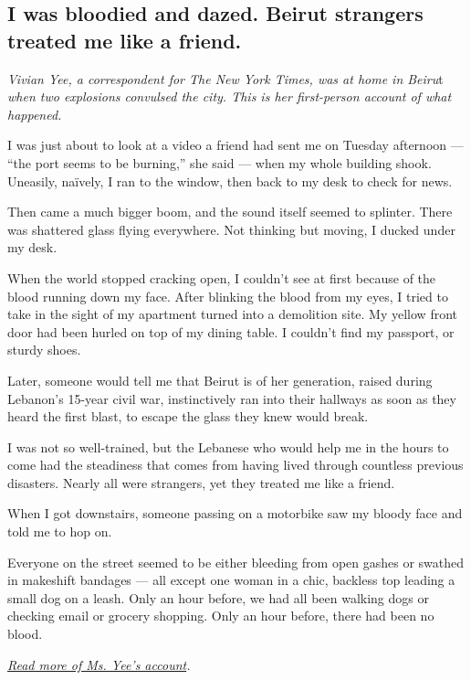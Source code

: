 \hypertarget{i-was-bloodied-and-dazed-beirut-strangers-treated-me-like-a-friend}{%
\subsection{I was bloodied and dazed. Beirut strangers treated me like a
friend.}\label{i-was-bloodied-and-dazed-beirut-strangers-treated-me-like-a-friend}}

\emph{Vivian Yee, a correspondent for The New York Times, was at home in
Beiru}t \emph{when two explosions convulsed the city. This is her
first-person account of what happened.}

I was just about to look at a video a friend had sent me on Tuesday
afternoon --- ``the port seems to be burning,'' she said --- when my
whole building shook. Uneasily, naïvely, I ran to the window, then back
to my desk to check for news.

Then came a much bigger boom, and the sound itself seemed to splinter.
There was shattered glass flying everywhere. Not thinking but moving, I
ducked under my desk.

When the world stopped cracking open, I couldn't see at first because of
the blood running down my face. After blinking the blood from my eyes, I
tried to take in the sight of my apartment turned into a demolition
site. My yellow front door had been hurled on top of my dining table. I
couldn't find my passport, or sturdy shoes.

Later, someone would tell me that Beirut is of her generation, raised
during Lebanon's 15-year civil war, instinctively ran into their
hallways as soon as they heard the first blast, to escape the glass they
knew would break.

I was not so well-trained, but the Lebanese who would help me in the
hours to come had the steadiness that comes from having lived through
countless previous disasters. Nearly all were strangers, yet they
treated me like a friend.

When I got downstairs, someone passing on a motorbike saw my bloody face
and told me to hop on.

Everyone on the street seemed to be either bleeding from open gashes or
swathed in makeshift bandages --- all except one woman in a chic,
backless top leading a small dog on a leash. Only an hour before, we had
all been walking dogs or checking email or grocery shopping. Only an
hour before, there had been no blood.

\href{https://www.nytimes3xbfgragh.onion/2020/08/04/world/middleeast/beirut-explosion-first-person.html}{\emph{Read
more of Ms. Yee's account}}\emph{.}

